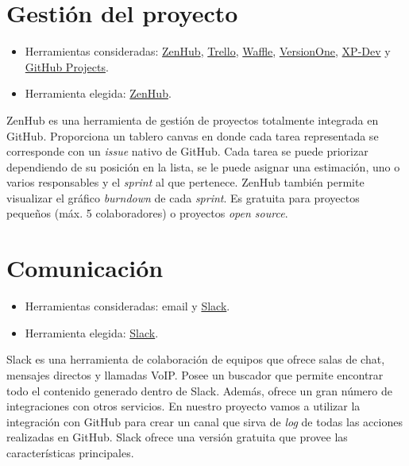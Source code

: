 \section{Gestión del proyecto}\label{gestion-del-proyecto}

\begin{itemize}
\tightlist
\item
  Herramientas consideradas: \href{https://www.zenhub.com/}{ZenHub},
  \href{https://trello.com/}{Trello}, \href{https://waffle.io/}{Waffle},
  \href{https://www.versionone.com/}{VersionOne},
  \href{https://xp-dev.com/}{XP-Dev} y \href{https://github.com/}{GitHub
  Projects}.
\item
  Herramienta elegida: \href{https://www.zenhub.com/}{ZenHub}.
\end{itemize}

ZenHub es una herramienta de gestión de proyectos totalmente integrada
en GitHub. Proporciona un tablero canvas en donde cada tarea
representada se corresponde con un \emph{issue} nativo de GitHub. Cada
tarea se puede priorizar dependiendo de su posición en la lista, se le
puede asignar una estimación, uno o varios responsables y el
\emph{sprint} al que pertenece. ZenHub también permite visualizar el
gráfico \emph{burndown} de cada \emph{sprint}. Es gratuita para
proyectos pequeños (máx. 5 colaboradores) o proyectos \emph{open
source}.

\section{Comunicación}\label{comunicacion}

\begin{itemize}
\tightlist
\item
  Herramientas consideradas: email y
  \href{https://gobees.slack.com/}{Slack}.
\item
  Herramienta elegida: \href{https://gobees.slack.com/}{Slack}.
\end{itemize}

Slack es una herramienta de colaboración de equipos que ofrece salas de
chat, mensajes directos y llamadas VoIP. Posee un buscador que permite
encontrar todo el contenido generado dentro de Slack. Además, ofrece un
gran número de integraciones con otros servicios. En nuestro proyecto
vamos a utilizar la integración con GitHub para crear un canal que sirva
de \emph{log} de todas las acciones realizadas en GitHub. Slack ofrece una
versión gratuita que provee las características principales.

